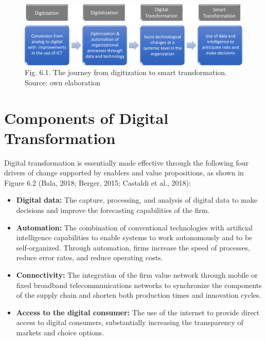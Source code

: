 \documentclass[
  letterpaper,
  DIV=11,
  numbers=noendperiod]{scrreprt}
\begin{document}
\begin{figure}

{\centering \includegraphics{img/fig2.png}

}

\caption{Fig. 6.1. The journey from digitization to smart
transformation. Source: own elaboration}

\end{figure}

\hypertarget{components-of-digital-transformation}{%
\section{Components of Digital
Transformation}\label{components-of-digital-transformation}}

Digital transformation is essentially made effective through the
following four drivers of change supported by enablers and value
propositions, as shown in Figure 6.2 (Bala, 2018; Berger, 2015; Castaldi
et al., 2018):

\begin{itemize}
\item
  \textbf{Digital data:} The capture, processing, and analysis of
  digital data to make decisions and improve the forecasting
  capabilities of the firm.
\item
  \textbf{Automation:} The combination of conventional technologies with
  artificial intelligence capabilities to enable systems to work
  autonomously and to be self-organized. Through automation, firms
  increase the speed of processes, reduce error rates, and reduce
  operating costs.
\item
  \textbf{Connectivity:} The integration of the firm value network
  through mobile or fixed broadband telecommunications networks to
  synchronize the components of the supply chain and shorten both
  production times and innovation cycles.
\item
  \textbf{Access to the digital consumer:} The use of the internet to
  provide direct access to digital consumers, substantially increasing
  the transparency of markets and choice options.
\end{itemize}
\end{document}
